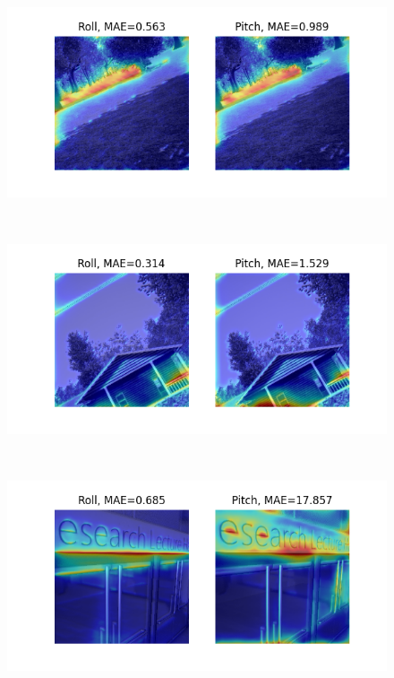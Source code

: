 \documentclass[a4paper, 10pt, conference]{ieeeconf}      %
\begin{document}
\begin{figure}[htpb]
\centering
  \begin{minipage}[htpb]{1.0\linewidth}
    \centering
    \includegraphics[keepaspectratio, scale=0.55]{./figure/appendix/known_env/image_12.png}
  \end{minipage} \\
  \begin{minipage}[htpb]{1.0\linewidth}
    \centering
    \includegraphics[keepaspectratio, scale=0.55]{./figure/appendix/known_env/image_35.png}
  \end{minipage} \\
\centering
  \begin{minipage}[htpb]{1.0\linewidth}
    \centering
    \includegraphics[keepaspectratio, scale=0.55]{./figure/appendix/unknown_env/image_4.png}

\end{minipage}
\end{figure}
\end{document}
